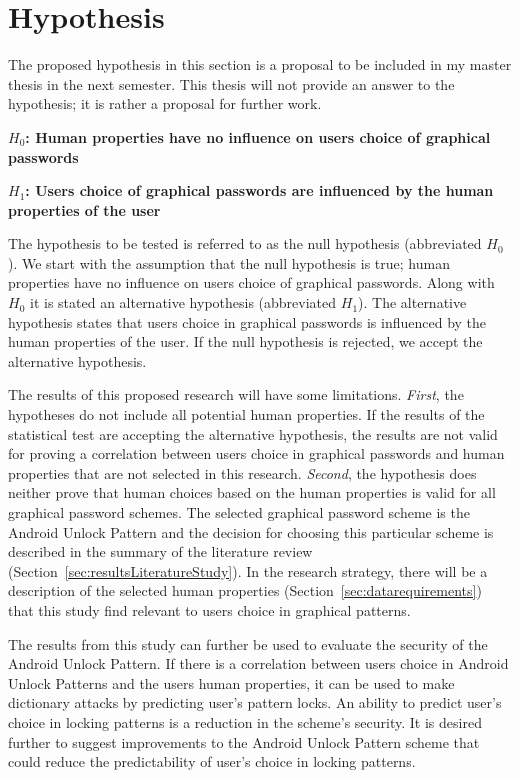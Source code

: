 \section{Hypothesis} \label{sec:hypothesis}

  The proposed hypothesis in this section is a proposal to be included in my master thesis in the next semester. This thesis will not provide an answer to the hypothesis; it is rather a proposal for further work.

  {\bf $H_{0}$: Human properties have no influence on users choice of graphical passwords}

  {\bf $H_{1}$: Users choice of graphical passwords are influenced by the human properties of the user}

  The hypothesis to be tested is referred to as the null hypothesis (abbreviated $H_{0}$). We start with the assumption that the null hypothesis is true; human properties have no influence on users choice of graphical passwords. Along with $H_{0}$ it is stated an alternative hypothesis (abbreviated $H_{1}$). The alternative hypothesis states that users choice in graphical passwords is influenced by the human properties of the user. If the null hypothesis is rejected, we accept the alternative hypothesis.

  The results of this proposed research will have some limitations. {\it First}, the hypotheses do not include all potential human properties. If the results of the statistical test are accepting the alternative hypothesis, the results are not valid for proving a correlation between users choice in graphical passwords and human properties that are not selected in this research.
  {\it Second}, the hypothesis does neither prove that human choices based on the human properties is valid for all graphical password schemes. The selected graphical password scheme is the Android Unlock Pattern and the decision for choosing this particular scheme is described in the summary of the literature review (Section~\ref{sec:resultsLiteratureStudy}).
  In the research strategy, there will be a description of the selected human properties (Section~\ref{sec:datarequirements}) that this study find relevant to users choice in graphical patterns.

  The results from this study can further be used to evaluate the security of the Android Unlock Pattern. If there is a correlation between users choice in Android Unlock Patterns and the users human properties, it can be used to make dictionary attacks by predicting user's pattern locks. An ability to predict user's choice in locking patterns is a reduction in the scheme's security. It is desired further to suggest improvements to the Android Unlock Pattern scheme that could reduce the predictability of user's choice in locking patterns.

